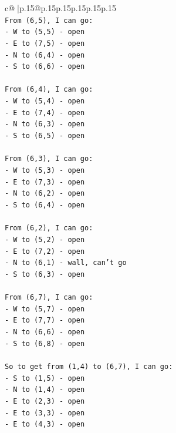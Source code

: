 \documentclass{article}
\begin{document}
{\begin{supertabular}{c@{$\;$}|p{.15\linewidth}@{}p{.15\linewidth}p{.15\linewidth}p{.15\linewidth}p{.15\linewidth}p{.15\linewidth}}
{{{\\ 
\texttt{From (6,5), I can go:} \\
\texttt{{-} W to (5,5) {-} open} \\
\texttt{{-} E to (7,5) {-} open} \\
\texttt{{-} N to (6,4) {-} open} \\
\texttt{{-} S to (6,6) {-} open} \\
\\ 
\texttt{From (6,4), I can go:} \\
\texttt{{-} W to (5,4) {-} open} \\
\texttt{{-} E to (7,4) {-} open} \\
\texttt{{-} N to (6,3) {-} open} \\
\texttt{{-} S to (6,5) {-} open} \\
\\ 
\texttt{From (6,3), I can go:} \\
\texttt{{-} W to (5,3) {-} open} \\
\texttt{{-} E to (7,3) {-} open} \\
\texttt{{-} N to (6,2) {-} open} \\
\texttt{{-} S to (6,4) {-} open} \\
\\ 
\texttt{From (6,2), I can go:} \\
\texttt{{-} W to (5,2) {-} open} \\
\texttt{{-} E to (7,2) {-} open} \\
\texttt{{-} N to (6,1) {-} wall, can't go} \\
\texttt{{-} S to (6,3) {-} open} \\
\\ 
\texttt{From (6,7), I can go:} \\
\texttt{{-} W to (5,7) {-} open} \\
\texttt{{-} E to (7,7) {-} open} \\
\texttt{{-} N to (6,6) {-} open} \\
\texttt{{-} S to (6,8) {-} open} \\
\\ 
\texttt{So to get from (1,4) to (6,7), I can go:} \\
\texttt{{-} S to (1,5) {-} open} \\
\texttt{{-} N to (1,4) {-} open} \\
\texttt{{-} E to (2,3) {-} open} \\
\texttt{{-} E to (3,3) {-} open} \\
\texttt{{-} E to (4,3) {-} open} \\
}}}
\end{supertabular}}
\end{document}
